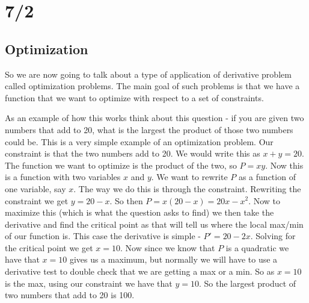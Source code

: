 \documentclass[12pt,reqno]{article}
\theoremstyle{definition}
\begin{document}
\section{7/2}

\subsection{Optimization}

So we are now going to talk about a type of application of derivative problem called optimization problems. The main goal of such problems is that we have a function that we want to optimize with respect to a set of constraints. 

As an example of how this works think about this question - if you are given two numbers that add to 20, what is the largest the product of those two numbers could be. This is a very simple example of an optimization problem. Our constraint is that the two numbers add to 20. We would write this as $x + y = 20$. The function we want to optimize is the product of the two, so $P = xy$. Now this is a function with two variables $x$ and $y$. We want to rewrite $P$ as a function of one variable, say $x$. The way we do this is through the constraint. Rewriting the constraint we get $y = 20 - x$. So then $P = x(20 - x) = 20x - x^2$. Now to maximize this (which is what the question asks to find) we then take the derivative and find the critical point as that will tell us where the local max/min of our function is. This case the derivative is simple - $P' = 20 - 2x$. Solving for the critical point we get $x = 10$. Now since we know that $P$ is a quadratic we have that $x = 10$ gives us a maximum, but normally we will have to use a derivative test to double check that we are getting a max or a min. So as $x = 10$ is the max, using our constraint we have that $y = 10$. So the largest product of two numbers that add to 20 is 100. 
\end{document}
